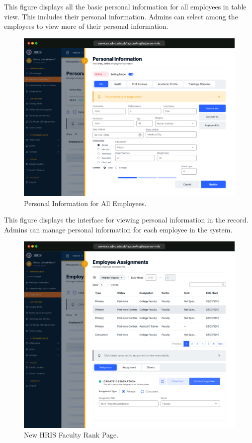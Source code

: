     This figure displays all the basic personal information for all employees in table view. This includes their personal information. Admins can select among the employees to view more of their personal information.

    \begin{figure}[H]
        \centering
        \includegraphics[width=1\linewidth]{figures/app/pi-info.png}
        \caption{Personal Information for All Employees.}
        \label{fig:app-pi-info}
    \end{figure}

    This figure displays the interface for viewing personal information in the record. Admins can manage personal information for each employee in the system.

    \begin{figure}[H]
        \centering
        \includegraphics[width=1\linewidth]{figures/app/assignment.png}
        \caption{New HRIS Faculty Rank Page.}
        \label{fig:app-assignment}
    \end{figure}

